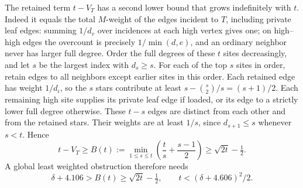 \documentclass[11pt,a4paper]{article}
\begin{document}
The retained term $t-V_T$ has a second lower bound that grows indefinitely with $t$. Indeed it equals the total $M$-weight of the edges incident to $T$, including private leaf edges: summing $1/d_v$ over incidences at each high vertex gives one; on high--high edges the overcount is precisely $1/\min(d,e)$, and an ordinary neighbor never has larger full degree. Order the full degrees of these $t$ sites decreasingly, and let $s$ be the largest index with $d_s\ge s$. For each of the top $s$ sites in order, retain edges to all neighbors except earlier sites in this order. Each retained edge has weight $1/d_i$, so the $s$ stars contribute at least $s-\binom{s}{2}/s=(s+1)/2$. Each remaining high site supplies its private leaf edge if loaded, or its edge to a strictly lower full degree otherwise. These $t-s$ edges are distinct from each other and from the retained stars. Their weights are at least $1/s$, since $d_{s+1}\le s$ whenever $s<t$. Hence
\[
 t-V_T\ge B(t):=\min_{1\le s\le t}\left(\frac ts+\frac{s-1}2\right)
 \ge\sqrt{2t}-\tfrac12 .
\]
A global least weighted obstruction therefore needs
\[
 \delta+4.106>B(t)\ge\sqrt{2t}-\tfrac12,
 \qquad t<(\delta+4.606)^2/2 .
\]
\end{document}
